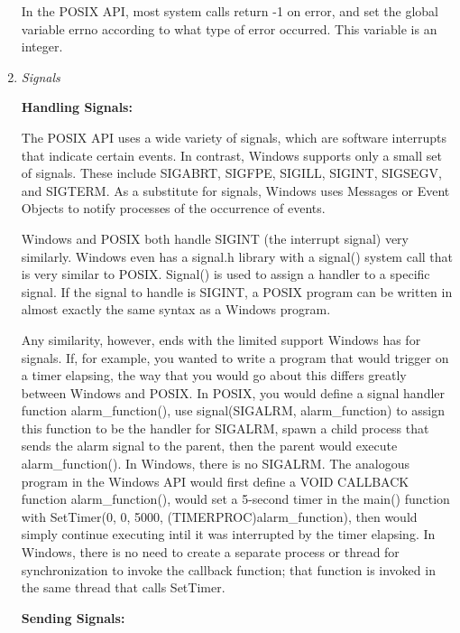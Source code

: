 \documentclass[letterpaper,10pt,titlepage]{article}
\newcommand{\tab}{\hspace*{2em}} %
\begin{document}
\begin{enumerate}
\tab In the POSIX API, most system calls return -1 on error, and set the global variable errno according to what type of error occurred. This variable is an integer. \newline %

\item \emph{Signals} \newline

\textbf{Handling Signals:}\newline

\tab The POSIX API uses a wide variety of signals, which are software interrupts that indicate certain events. In contrast, Windows supports only a small set of signals. These include SIGABRT, SIGFPE, SIGILL, SIGINT, SIGSEGV, and SIGTERM. As a substitute for signals, Windows uses Messages or Event Objects to notify processes of the occurrence of events.\newline

\tab Windows and POSIX both handle SIGINT (the interrupt signal) very similarly. Windows even has a signal.h library with a signal() system call that is very similar to POSIX. Signal() is used to assign a handler to a specific signal. If the signal to handle is SIGINT, a POSIX program can be written in almost exactly the same syntax as a Windows program.\newline

\tab Any similarity, however, ends with the limited support Windows has for signals. If, for example, you wanted to write a program that would trigger on a timer elapsing, the way that you would go about this differs greatly between Windows and POSIX. In POSIX, you would define a signal handler function alarm\_function(), use signal(SIGALRM, alarm\_function) to assign this function to be the handler for SIGALRM, spawn a child process that sends the alarm signal to the parent, then the parent would execute alarm\_function(). In Windows, there is no SIGALRM. The analogous program in the Windows API would first define a VOID CALLBACK function alarm\_function(), would set a 5-second timer in the main() function with SetTimer(0, 0, 5000, (TIMERPROC)alarm\_function), then would simply continue executing intil it was interrupted by the timer elapsing. In Windows, there is no need to create a separate process or thread for synchronization to invoke the callback function; that function is invoked in the same thread that calls SetTimer. \newline


\textbf{Sending Signals:} \newline


\end{enumerate}
\end{document}
